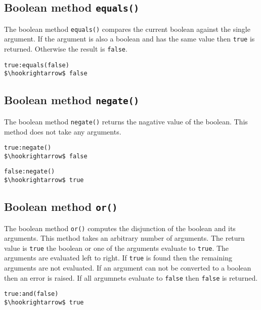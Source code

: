 \documentclass[11pt,a4paper]{scrbook}
\newcommand\keyword[1]{\texttt{#1}}
\newcommand\method[1]{\texttt{#1}}
\begin{document}
\subsection{Boolean method \method{equals()}}

The boolean method \method{equals()} compares the current boolean against the
single argument. If the argument is also a boolean and has the same value then
\keyword{true} is returned. Otherwise the result is \keyword{false}.

\begin{lstlisting}[language=BibTool,mathescape=true]
true:equals(false)
$\hookrightarrow$ false
\end{lstlisting}

\subsection{Boolean method \method{negate()}}

The boolean method \method{negate()} returns the nagative value of the
boolean. This method does not take any arguments.

\begin{lstlisting}[language=BibTool,mathescape=true]
true:negate()
$\hookrightarrow$ false
\end{lstlisting}

\begin{lstlisting}[language=BibTool,mathescape=true]
false:negate()
$\hookrightarrow$ true
\end{lstlisting}

\subsection{Boolean method \method{or()}}

The boolean method \method{or()} computes the disjunction of the boolean and
its arguments. This method takes an arbitrary number of arguments. The return
value is \keyword{true} the boolean or one of the arguments evaluate to
\keyword{true}. The arguments are evaluated left to right. If \keyword{true}
is found then the remaining arguments are not evaluated. If an argument can
not be converted to a boolean then an error is raised. If all argumnets
evaluate to \keyword{false} then \keyword{false} is returned.

\begin{lstlisting}[language=BibTool,mathescape=true]
true:and(false)
$\hookrightarrow$ true
\end{lstlisting}
\end{document}

